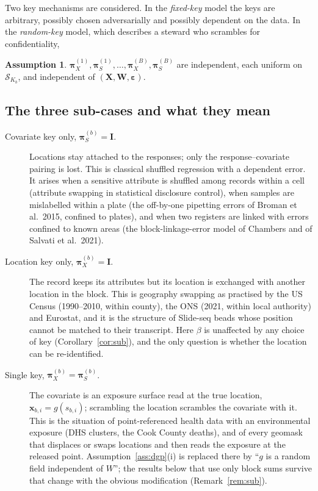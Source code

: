 \documentclass[11pt]{article}
\theoremstyle{definition}
\newtheorem{assumption}{Assumption}
\newcommand{\bX}{\mathbf{X}}
\newcommand{\bx}{\bm{x}}\newcommand{\bg}{\bm{g}}\newcommand{\bw}{\bm{w}}\newcommand{\bz}{\bm{z}}
\newcommand{\bW}{\mathbf{W}}
\newcommand{\bI}{\mathbf{I}}
\newcommand{\beps}{\boldsymbol{\varepsilon}}
\newcommand{\bpi}{\boldsymbol{\pi}}
\newcommand{\calS}{\mathcal{S}}
\begin{document}
Two key mechanisms are considered. In the \emph{fixed-key} model the keys are arbitrary, possibly chosen adversarially and possibly dependent on the data. In the \emph{random-key} model, which describes a steward who scrambles for confidentiality,
\begin{assumption}\label{ass:keys}
$\bpi_X^{(1)},\bpi_S^{(1)},\dots,\bpi_X^{(B)},\bpi_S^{(B)}$ are independent, each uniform on $\calS_{K_b}$, and independent of $(\bX,\bW,\beps)$.
\end{assumption}

\subsection{The three sub-cases and what they mean}\label{sec:subcases}

\begin{description}
\item[Covariate key only, $\bpi_S^{(b)}=\bI$.] Locations stay attached to the responses; only the response--covariate pairing is lost. This is classical shuffled regression with a dependent error. It arises when a sensitive attribute is shuffled among records within a cell (attribute swapping in statistical disclosure control), when samples are mislabelled within a plate (the off-by-one pipetting errors of Broman et al.\ 2015, confined to plates), and when two registers are linked with errors confined to known areas (the block-linkage-error model of Chambers and of Salvati et al.\ 2021).
\item[Location key only, $\bpi_X^{(b)}=\bI$.] The record keeps its attributes but its location is exchanged with another location in the block. This is geography swapping as practised by the US Census (1990--2010, within county), the ONS (2021, within local authority) and Eurostat, and it is the structure of Slide-seq beads whose position cannot be matched to their transcript. Here $\beta$ is unaffected by any choice of key (Corollary~\ref{cor:sub}), and the only question is whether the location can be re-identified.
\item[Single key, $\bpi_X^{(b)}=\bpi_S^{(b)}$.] The covariate is an exposure surface read at the true location, $\bx_{b,i}=g(s_{b,i})$; scrambling the location scrambles the covariate with it. This is the situation of point-referenced health data with an environmental exposure (DHS clusters, the Cook County deaths), and of every geomask that displaces or swaps locations and then reads the exposure at the released point. Assumption~\ref{ass:dgp}(i) is replaced there by ``$g$ is a random field independent of $W$''; the results below that use only block sums survive that change with the obvious modification (Remark~\ref{rem:sub}).

\end{description}
\end{document}
